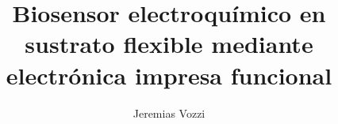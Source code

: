 \documentclass[twoside,numbers,spanish]{clases}
\author{Jeremias Vozzi}
\title{Biosensor electroqu\'imico en sustrato flexible mediante electr\'onica impresa funcional}
\begin{document}







\tableofcontents
\listoffigures







\appendix
\renewcommand{\appendixname}{Anexo}





\end{document}
